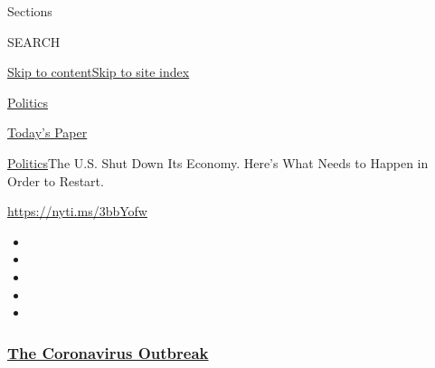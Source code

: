 Sections

SEARCH

\protect\hyperlink{site-content}{Skip to
content}\protect\hyperlink{site-index}{Skip to site index}

\href{https://www.nytimes3xbfgragh.onion/section/politics}{Politics}

\href{https://myaccount.nytimes3xbfgragh.onion/auth/login?response_type=cookie\&client_id=vi}{}

\href{https://www.nytimes3xbfgragh.onion/section/todayspaper}{Today's
Paper}

\href{/section/politics}{Politics}\textbar{}The U.S. Shut Down Its
Economy. Here's What Needs to Happen in Order to Restart.

\url{https://nyti.ms/3bbYofw}

\begin{itemize}
\item
\item
\item
\item
\item
\end{itemize}

\hypertarget{the-coronavirus-outbreak}{%
\subsubsection{\texorpdfstring{\href{https://www.nytimes3xbfgragh.onion/news-event/coronavirus?name=styln-coronavirus-national\&region=TOP_BANNER\&block=storyline_menu_recirc\&action=click\&pgtype=Article\&impression_id=59f65b60-f27e-11ea-879c-3d80aa080e10\&variant=undefined}{The
Coronavirus
Outbreak}}{The Coronavirus Outbreak}}\label{the-coronavirus-outbreak}}

